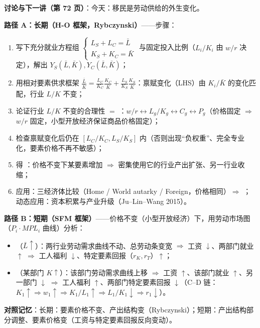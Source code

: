 \textbf{讨论与下一讲（第 72 页）}：今天：移民是劳动供给的外生变化。


\begin{mapbox}
\textbf{路径 A：长期（H-O 框架，Rybczynski）}——步骤：
\begin{enumerate}
  \item 写下充分就业方程组 $\begin{cases} L_S + L_C = \bar L \\ K_S + K_C = \bar K \end{cases}$ 与固定投入比例（$L_i/K_i$ 由 $w/r$ 决定），解出 $Y_S(\bar L, \bar K), Y_C(\bar L, \bar K)$；
  \item 用相对要素供求框架 $\frac{\bar L}{\bar K} = \frac{L_C}{K_C}\frac{K_C}{\bar K} + \frac{L_S}{K_S}\frac{K_S}{\bar K}$：禀赋变化（LHS）由 $K_i/\bar K$ 的变化匹配，行业 $L/K$ 不变；
  \item 论证行业 $L/K$ 不变的合理性 $=$ ：$w/r \leftrightarrow L_g/K_g \leftrightarrow C_g \leftrightarrow P_g$（价格固定 $\Rightarrow$ $w/r$ 固定，小型开放经济保证商品价格固定）；
  \item 检查禀赋变化后仍在 $[L_C/K_C, L_S/K_S]$ 内（否则出现``负权重''、完全专业化，要素价格不再不敏感）；
  \item 得 ：价格不变下某要素增加 $\Rightarrow$ 密集使用它的行业产出扩张、另一行业收缩；
  \item 应用：三经济体比较（Home / World autarky / Foreign，价格相同）$\Rightarrow$ ；动态应用：资本积累与产业升级（Ju--Lin--Wang 2015）。
\end{enumerate}
\textbf{路径 B：短期（SFM 框架）}——价格不变（小型开放经济）下，用劳动市场图（$P_i \cdot MPL_i$ 曲线）分析：
\begin{itemize}
  \item {}（$\bar L \uparrow$）：两行业劳动需求曲线不动、总劳动条变宽 $\Rightarrow$ 工资 $\downarrow$、两部门就业 $\uparrow$ $\Rightarrow$ 工人福利 $\downarrow$、特定要素回报（$r_K, r_T$）$\uparrow$；
  \item {}（某部门 $K \uparrow$）：该部门劳动需求曲线上移 $\Rightarrow$ 工资 $\uparrow$、该部门就业 $\uparrow$、另一部门 $\downarrow$ $\Rightarrow$ 工人福利 $\uparrow$、两部门特定要素回报 $\downarrow$（C--D 链：$K_1 \uparrow \Rightarrow w_1 \uparrow \Rightarrow K_1/L_1 \uparrow \Rightarrow L_1/K_1 \downarrow \Rightarrow r_1 \downarrow$）。
\end{itemize}
\textbf{对照记忆}：长期：要素价格不变、产出结构变（Rybczynski）；短期：产出结构部分调整、要素价格变（工资与特定要素回报反向变动）。
\end{mapbox}

